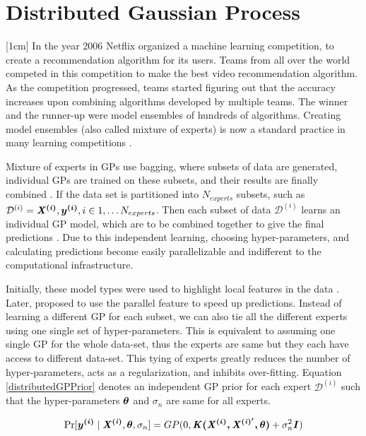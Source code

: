 \section{Distributed Gaussian Process}\label{secDgp}
[1cm]
In the year 2006 Netflix organized a machine learning competition, to create a recommendation algorithm for its users. Teams from all over the world competed in this competition to make the best video recommendation algorithm. As the competition progressed, teams started figuring out that the accuracy increases upon combining algorithms developed by multiple teams. The winner and the runner-up were model ensembles of hundreds of algorithms. Creating model ensembles (also called mixture of experts) is now a standard practice in many learning competitions \cite{bauer1998empirical}. 

Mixture of experts in GPs use bagging, where subsets of data are generated, individual GPs are trained on these subsets, and their results are finally combined \cite{chen2009bagging}. If the data set is partitioned  into $N_{experts}$ subsets, such as $\mathcal{D}^{(i)} = {\bm{\mathit{X^{(i)}}}, \boldsymbol{y^{(i)}}}, i \in 1, \ldots N_{experts}$. Then each subset of data $\mathcal{D}^{(i)}$ learns an individual GP model, which are to be combined together to give the final predictions . Due to this independent learning, choosing hyper-parameters, and calculating predictions become easily parallelizable and indifferent to the computational infrastructure. 

\sloppy Initially, these model types were used to highlight local features in the data \cite{rasmussen2002infinite}. Later,  \cite{ng2014hierarchical} proposed to use the parallel feature to speed up predictions. Instead of learning a different GP for each subset, we can also tie all the different experts using one single set of hyper-parameters. This is equivalent to assuming one single GP for the whole data-set, thus the experts are same but they each have access to different data-set. This tying of experts greatly reduces the number of hyper-parameters, acts as a regularization, and inhibits over-fitting. Equation \ref{distributedGPPrior} denotes an independent GP prior for each expert $\mathcal{D}^{(i)}$ such that the hyper-parameters $\boldsymbol{\theta}$ and $\sigma_{n}$ are same for all experts.

\begin{equation}\label{distributedGPPrior}
    \Pr[\boldsymbol{y^{(i)}} \mid \bm{\mathit{X^{(i)}}}, \boldsymbol{\theta}, \sigma_{n}] = GP(0, \bm{\mathit{K(\boldsymbol{X^{(i)}}, X^{(i)'}, \theta)}} + \sigma^{2}_{n}\bm{\mathit{I}}) 
\end{equation}

